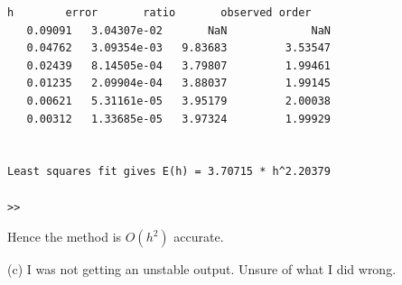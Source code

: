 \documentclass[9pt,oneside,openany]{memoir}
\begin{document}
\begin{solution}
\begin{lstlisting}[style=console]
      h        error       ratio       observed order
   0.09091   3.04307e-02       NaN             NaN
   0.04762   3.09354e-03   9.83683         3.53547
   0.02439   8.14505e-04   3.79807         1.99461
   0.01235   2.09904e-04   3.88037         1.99145
   0.00621   5.31161e-05   3.95179         2.00038
   0.00312   1.33685e-05   3.97324         1.99929
 
 
Least squares fit gives E(h) = 3.70715 * h^2.20379
 
>>    
\end{lstlisting}
Hence the method is $O(h^2)$ accurate.

(c) I was not getting an unstable output. Unsure of what I did wrong.

\end{solution}

\begin{exercise}[manual-num={9.3}]
\end{exercise}
\end{document}
